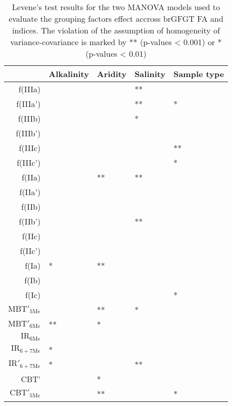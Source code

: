 \begin{table}[ht]
\centering
\caption{Levene's test results for the two MANOVA models used to evaluate the grouping factors effect accross brGFGT FA and indices. The violation of the assumption of homogeneity of variance-covariance is marked by ** (p-values < 0.001) or * (p-values < 0.01)} 
\label{SI_Table_Lavene}
\begin{tabular}{rllll}
  \toprule
 & \textbf{Alkalinity} & \textbf{Aridity} & \textbf{Salinity} & \textbf{Sample type} \\ 
  \midrule
f(IIIa) &  &  & ** &  \\ 
  f(IIIa') &  &  & ** & * \\ 
  f(IIIb) &  &  & * &  \\ 
  f(IIIb') &  &  &  &  \\ 
  f(IIIc) &  &  &  & ** \\ 
  f(IIIc') &  &  &  & * \\ 
  f(IIa) &  & ** & ** &  \\ 
  f(IIa') &  &  &  &  \\ 
  f(IIb) &  &  &  &  \\ 
  f(IIb') &  &  & ** &  \\ 
  f(IIc) &  &  &  &  \\ 
  f(IIc') &  &  &  &  \\ 
  f(Ia) & * & ** &  &  \\ 
  f(Ib) &  &  &  &  \\ 
  f(Ic) &  &  &  & * \\ 
   \midrule
$\mathrm{MBT'_{5Me}}$ &  & ** & * &  \\ 
  $\mathrm{MBT'_{6Me}}$ & ** & * &  &  \\ 
  $\mathrm{IR_{6Me}}$ &  &  &  &  \\ 
  $\mathrm{IR_{6+7Me}}$ & * &  &  &  \\ 
  $\mathrm{IR'_{6+7Me}}$ & * &  & ** &  \\ 
  CBT' &  & * &  &  \\ 
  $\mathrm{CBT'_{5Me}}$ &  & ** &  & * \\ 
   \bottomrule
\end{tabular}
\end{table}
